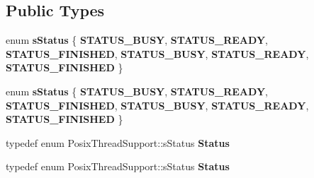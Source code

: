 \subsection*{Public Types}
\begin{DoxyCompactItemize}
\item 
\mbox{\label{classPosixThreadSupport_abfdc59ca08a829e71676df2525503e1f}} 
enum {\bfseries s\+Status} \{ \newline
{\bfseries S\+T\+A\+T\+U\+S\+\_\+\+B\+U\+SY}, 
{\bfseries S\+T\+A\+T\+U\+S\+\_\+\+R\+E\+A\+DY}, 
{\bfseries S\+T\+A\+T\+U\+S\+\_\+\+F\+I\+N\+I\+S\+H\+ED}, 
{\bfseries S\+T\+A\+T\+U\+S\+\_\+\+B\+U\+SY}, 
\newline
{\bfseries S\+T\+A\+T\+U\+S\+\_\+\+R\+E\+A\+DY}, 
{\bfseries S\+T\+A\+T\+U\+S\+\_\+\+F\+I\+N\+I\+S\+H\+ED}
 \}
\item 
\mbox{\label{classPosixThreadSupport_abfdc59ca08a829e71676df2525503e1f}} 
enum {\bfseries s\+Status} \{ \newline
{\bfseries S\+T\+A\+T\+U\+S\+\_\+\+B\+U\+SY}, 
{\bfseries S\+T\+A\+T\+U\+S\+\_\+\+R\+E\+A\+DY}, 
{\bfseries S\+T\+A\+T\+U\+S\+\_\+\+F\+I\+N\+I\+S\+H\+ED}, 
{\bfseries S\+T\+A\+T\+U\+S\+\_\+\+B\+U\+SY}, 
\newline
{\bfseries S\+T\+A\+T\+U\+S\+\_\+\+R\+E\+A\+DY}, 
{\bfseries S\+T\+A\+T\+U\+S\+\_\+\+F\+I\+N\+I\+S\+H\+ED}
 \}
\item 
\mbox{\label{classPosixThreadSupport_a7344692b4f763cafbe540c8dac18c5c8}} 
typedef enum Posix\+Thread\+Support\+::s\+Status {\bfseries Status}
\item 
\mbox{\label{classPosixThreadSupport_a7344692b4f763cafbe540c8dac18c5c8}} 
typedef enum Posix\+Thread\+Support\+::s\+Status {\bfseries Status}
\end{DoxyCompactItemize}
